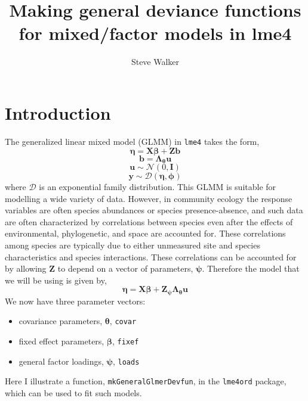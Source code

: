 \documentclass[12pt]{article}\usepackage[]{graphicx}\usepackage[]{color}
\author{Steve Walker}
\title{Making general deviance functions for mixed/factor models in lme4}
\date{}
\newcommand{\dnorm}{\mathcal{N}}
\newcommand{\dexpfam}{\mathcal{D}}
\begin{document}
\maketitle
\tableofcontents

\section{Introduction}

The generalized linear mixed model (GLMM) in \texttt{lme4} takes the
form,
\begin{equation}
  \label{eq:6}
  \bm\eta = \bm X\bm\beta + \bm Z\bm b
\end{equation}
\begin{equation}
  \label{eq:10}
  \bm b = \bm\Lambda_{\bm\theta}\bm u
\end{equation}
\begin{equation}
  \label{eq:7}
  \bm u \sim \dnorm(0, \bm I)
\end{equation}
\begin{equation}
  \label{eq:8}
  \bm y \sim \dexpfam (\bm\eta, \bm\phi)
\end{equation}
where $\dexpfam$ is an exponential family distribution. This GLMM is
suitable for modelling a wide variety of data.  However, in community
ecology the response variables are often species abundances or species
presence-absence, and such data are often characterized by
correlations between species even after the effects of environmental,
phylogenetic, and space are accounted for.  These correlations among
species are typically due to either unmeasured site and species
characteristics and species interactions.  These correlations can be
accounted for by allowing $\bm Z$ to depend on a vector of parameters,
$\bm\psi$.  Therefore the model that we will be using is given by,
\begin{equation}
  \label{eq:6}
  \bm\eta = \bm X\bm\beta + \bm Z_{\bm\psi}\bm\Lambda_{\bm\theta}\bm u
\end{equation}
We now have three parameter vectors:
\begin{itemize}
\item covariance parameters, $\bm\theta$, \texttt{covar}
\item fixed effect parameters, $\bm\beta$, \texttt{fixef}
\item general factor loadings, $\bm\psi$, \texttt{loads}
\end{itemize}
Here I illustrate a function, \texttt{mkGeneralGlmerDevfun}, in the
\texttt{lme4ord} package, which can be used to fit such models.
\end{document}
